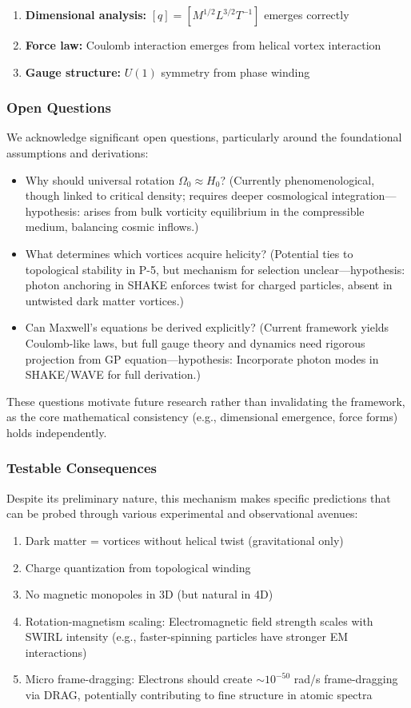 \begin{enumerate}
\item \textbf{Dimensional analysis:} $[q] = [M^{1/2} L^{3/2} T^{-1}]$ emerges correctly
\item \textbf{Force law:} Coulomb interaction emerges from helical vortex interaction
\item \textbf{Gauge structure:} $U(1)$ symmetry from phase winding
\end{enumerate}

\subsubsection{Open Questions}
We acknowledge significant open questions, particularly around the foundational assumptions and derivations:
\begin{itemize}
\item Why should universal rotation $\Omega_0 \approx H_0$? (Currently phenomenological, though linked to critical density; requires deeper cosmological integration---hypothesis: arises from bulk vorticity equilibrium in the compressible medium, balancing cosmic inflows.)
\item What determines which vortices acquire helicity? (Potential ties to topological stability in P-5, but mechanism for selection unclear---hypothesis: photon anchoring in SHAKE enforces twist for charged particles, absent in untwisted dark matter vortices.)
\item Can Maxwell's equations be derived explicitly? (Current framework yields Coulomb-like laws, but full gauge theory and dynamics need rigorous projection from GP equation---hypothesis: Incorporate photon modes in SHAKE/WAVE for full derivation.)
\end{itemize}
These questions motivate future research rather than invalidating the framework, as the core mathematical consistency (e.g., dimensional emergence, force forms) holds independently.

\subsubsection{Testable Consequences}
Despite its preliminary nature, this mechanism makes specific predictions that can be probed through various experimental and observational avenues:
\begin{enumerate}
\item Dark matter = vortices without helical twist (gravitational only)
\item Charge quantization from topological winding
\item No magnetic monopoles in 3D (but natural in 4D)
\item Rotation-magnetism scaling: Electromagnetic field strength scales with SWIRL intensity (e.g., faster-spinning particles have stronger EM interactions)
\item Micro frame-dragging: Electrons should create $\sim 10^{-50}$ rad/s frame-dragging via DRAG, potentially contributing to fine structure in atomic spectra
\end{enumerate}

